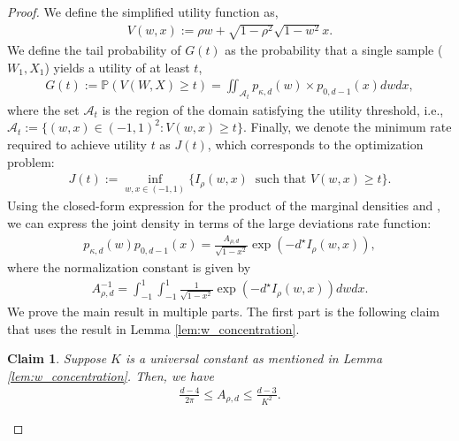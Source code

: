 \documentclass[12pt]{article}
\newtheorem{claim}[theorem]{Claim}
\theoremstyle{definition}
\theoremstyle{remark}
\begin{document}
\begin{proof}
We define the simplified utility function as,
\begin{align} \label{eq:utility_def}
V(w,x) := \rho w + \sqrt{1-\rho^2} \sqrt{1-w^2} x.
\end{align}
We define the tail probability of $G(t)$ as the probability that a single sample ($W_1,X_1$) yields a utility of at least $t$,
\begin{align}
\label{eq:tail_prob_def}
G(t) := \mathbb{P}\left( V(W, X) \geq t \right) = \iint_{\mathcal{A}_t} p_{\kappa, d}(w) \times p_{0, d-1}(x) dw  dx,
\end{align}
where the set $\mathcal{A}_t$ is the region of the domain satisfying the utility threshold, i.e., $\mathcal{A}_t := \{ (w, x) \in (-1,1)^2 : V(w, x) \geq t \}.$ Finally, we denote the minimum rate required to achieve utility $t$ as $J(t)$, which corresponds to the optimization problem:
\begin{align} \label{eq:min_rate_def}
J(t) := \inf_{w,x \in (-1,1)} \big\{I_\rho(w, x) \ \text{ such that } V(w,x) \geq t \big\}.
\end{align}
Using the closed-form expression for the product of the marginal densities  and , we can express the joint density in terms of the large deviations rate function:
\begin{align}
\label{eq:pdf_G}
p_{\kappa, d}(w) p_{0, d-1}(x) = \frac{A_{\rho, d}}{\sqrt{1-x^2}} \exp\left(-d^{\star} I_{\rho}(w,x)\right),
\end{align}
where the normalization constant is given by
\begin{align*}
A_{\rho, d}^{-1} = \int_{-1}^1 \int_{-1}^1 \frac{1}{\sqrt{1-x^2}} \exp\left(-d^{\star} I_{\rho}(w,x)\right)dw dx.
\end{align*}
We prove the main result in multiple parts. The first part is the following claim that uses the result in Lemma \ref{lem:w_concentration}.

\begin{claim}
\label{claim:A_rho_d_bound}
Suppose $K$ is a universal constant as mentioned in Lemma \ref{lem:w_concentration}. Then, we have
\begin{align*}
   \frac{d - 4}{2\pi} \leq A_{\rho, d} \leq \frac{d -3}{K^2}.
\end{align*}
\end{claim}


\end{proof}
\end{document}

